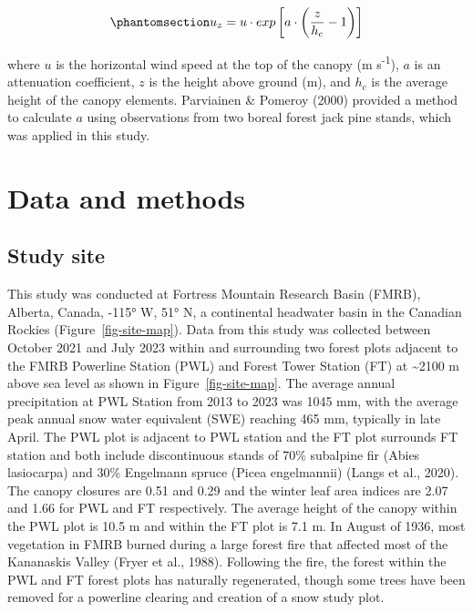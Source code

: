 \documentclass[
  letterpaper,
  DIV=11,
  numbers=noendperiod]{scrartcl}
\begin{document}
\begin{equation}\phantomsection\label{eq-cionco}{
u_z = u\cdot exp\left[a\cdot\left(\frac{z}{h_c}-1\right)\right]
}\end{equation}

where \(u\) is the horizontal wind speed at the top of the canopy (m
s\textsuperscript{-1}), \(a\) is an attenuation coefficient, \(z\) is
the height above ground (m), and \(h_c\) is the average height of the
canopy elements. Parviainen \& Pomeroy (2000) provided a method to
calculate \(a\) using observations from two boreal forest jack pine
stands, which was applied in this study.

\section{Data and methods}\label{data-and-methods}

\subsection{Study site}\label{study-site}

This study was conducted at Fortress Mountain Research Basin (FMRB),
Alberta, Canada, -115° W, 51° N, a continental headwater basin in the
Canadian Rockies (Figure~\ref{fig-site-map}). Data from this study was
collected between October 2021 and July 2023 within and surrounding two
forest plots adjacent to the FMRB Powerline Station (PWL) and Forest
Tower Station (FT) at \textasciitilde2100 m above sea level as shown in
Figure~\ref{fig-site-map}. The average annual precipitation at PWL
Station from 2013 to 2023 was 1045 mm, with the average peak annual snow
water equivalent (SWE) reaching 465 mm, typically in late April. The PWL
plot is adjacent to PWL station and the FT plot surrounds FT station and
both include discontinuous stands of 70\% subalpine fir (Abies
lasiocarpa) and 30\% Engelmann spruce (Picea engelmannii) (Langs et al.,
2020). The canopy closures are 0.51 and 0.29 and the winter leaf area
indices are 2.07 and 1.66 for PWL and FT respectively. The average
height of the canopy within the PWL plot is 10.5 m and within the FT
plot is 7.1 m. In August of 1936, most vegetation in FMRB burned during
a large forest fire that affected most of the Kananaskis Valley (Fryer
et al., 1988). Following the fire, the forest within the PWL and FT
forest plots has naturally regenerated, though some trees have been
removed for a powerline clearing and creation of a snow study plot.
\end{document}
